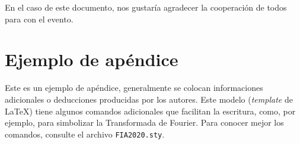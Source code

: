 \documentclass[12pt, a4paper, twoside, twocolumn]{article}
\begin{document}
En el caso de este documento, nos gustaría agradecer la cooperación de todos para con el evento.
\renewcommand{\refname}{Referencias} 
%  
{{\fontrefs }
\appendix
\section{Ejemplo de apéndice}

Este es un ejemplo de apéndice, generalmente se colocan informaciones adicionales o deducciones producidas por los autores.
Este modelo (\textit{template} de \LaTeX) tiene algunos comandos adicionales que facilitan la escritura, como, por ejemplo,  \F\xspace para simbolizar la Transformada de Fourier. Para conocer mejor los comandos, consulte el archivo  \texttt{FIA2020.sty}.

}
%
%

\end{document}
